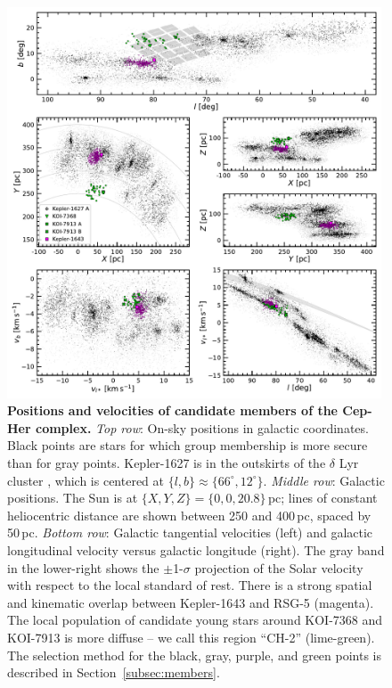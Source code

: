 \documentclass[12pt,twocolumn,linenumbers]{aastex63}
\begin{document}
\begin{figure}[t]
	\begin{center}
		\leavevmode
		\includegraphics[width=0.99\textwidth]{f1.pdf}
	\end{center}
	\vspace{-0.7cm}
	\caption{
  {\bf Positions and velocities of candidate members of the Cep-Her
  complex.}
  {\it Top row}: On-sky positions in galactic coordinates.  Black
  points are stars for which group membership is more secure than for
  gray points.
  Kepler-1627 is in the outskirts of the $\delta$ Lyr cluster
  \citep{bouma_kep1627_2022}, which is centered at $\{ l, b\} \approx
  \{ 66^\circ, 12^\circ\}$.
  {\it Middle row}: Galactic positions.  The Sun is at $\{X, Y, Z\} =
  \{0, 0, 20.8\}$\,pc; lines of constant heliocentric distance are
  shown between 250 and 400\,pc, spaced by 50\,pc.
  {\it Bottom row}: Galactic tangential velocities (left) and
  galactic longitudinal velocity versus galactic longitude (right).
  The gray band in the lower-right shows the $\pm$1-$\sigma$
  projection of the Solar velocity with respect to the local standard
  of rest.  There is a strong spatial and kinematic overlap between
  Kepler-1643 and RSG-5 (magenta).  The local population
  of candidate young stars around KOI-7368 and KOI-7913 is more
  diffuse -- we call this region ``CH-2'' (lime-green).
  The selection method for the black, gray, purple, and green points
  is described in Section~\ref{subsec:members}.
	\label{fig:XYZvtang}
	}
\end{figure}
\end{document}
